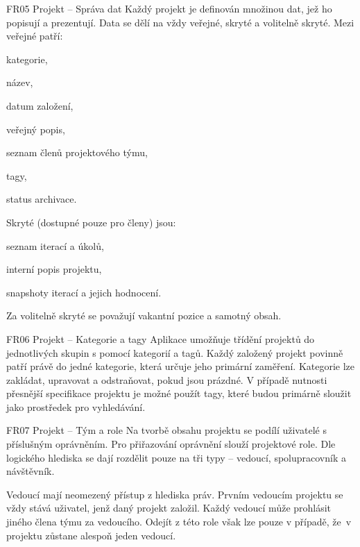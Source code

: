 \begin{dl}
   \item[FR05 Projekt -- Správa dat]
   Každý projekt je definován množinou dat, jež ho popisují a prezentují. Data se dělí na vždy veřejné, skryté a volitelně skryté. Mezi veřejné patří: 

   \begin{ulnar}
      \item kategorie,
      \item název,
      \item datum založení,
      \item veřejný popis,
      \item seznam členů projektového týmu,
      \item tagy,
      \item status archivace.
   \end{ulnar}


   Skryté (dostupné pouze pro členy) jsou: 

   \begin{ulnar}
      \item seznam iterací a úkolů, 
      \item interní popis projektu, 
      \item snapshoty iterací a jejich hodnocení.
   \end{ulnar}
   

   Za volitelně skryté se považují vakantní pozice a samotný obsah.

   \item[FR06 Projekt -- Kategorie a tagy]
   Aplikace umožňuje třídění projektů do jednotlivých skupin s pomocí kategorií a tagů. Každý založený projekt povinně patří právě do jedné kategorie, která určuje jeho primární zaměření. Kategorie lze zakládat, upravovat a odstraňovat, pokud jsou prázdné. V případě nutnosti přesnější specifikace projektu je možné použít tagy, které budou primárně sloužit jako prostředek pro vyhledávání.

   \item[FR07 Projekt -- Tým a role]
   Na tvorbě obsahu projektu se podílí uživatelé s příslušným oprávněním. Pro přiřazování oprávnění slouží projektové role. Dle logického hlediska se dají rozdělit pouze na tři typy -- vedoucí, spolupracovník a návštěvník.

   \newpage
   Vedoucí mají neomezený přístup z hlediska práv. Prvním vedoucím projektu se vždy stává uživatel, jenž daný projekt založil. Každý vedoucí může prohlásit jiného člena týmu za vedoucího. Odejít z této role však lze pouze v případě, že~v projektu zůstane alespoň jeden vedoucí.


\end{dl}
